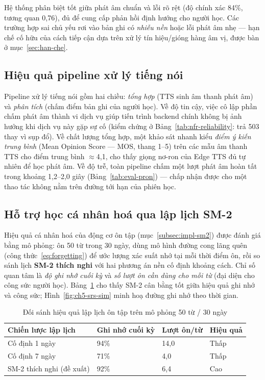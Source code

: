 Hệ thống phân biệt tốt giữa phát âm chuẩn và lỗi rõ rệt (độ chính xác 84\%,
tương quan 0,76), đủ để cung cấp phản hồi định hướng cho người học. Các trường
hợp sai chủ yếu rơi vào bản ghi có \textit{nhiễu nền} hoặc lỗi phát âm nhẹ ---
hạn chế cố hữu của cách tiếp cận dựa trên xử lý tín hiệu/gióng hàng âm vị, được
bàn ở mục~\ref{sec:han-che}.

\subsection{Hiệu quả pipeline xử lý tiếng nói}
\label{subsec:eval-speech}

Pipeline xử lý tiếng nói gồm hai chiều: \textit{tổng hợp} (TTS sinh âm thanh
phát âm) và \textit{phân tích} (chấm điểm bản ghi của người học). Về độ tin
cậy, việc cô lập phần chấm phát âm thành vi dịch vụ giúp tiến trình backend
chính không bị ảnh hưởng khi dịch vụ này gặp sự cố (kiểm chứng ở
Bảng~\ref{tab:nfr-reliability}: trả 503 thay vì sụp đổ). Về chất lượng tổng
hợp, một khảo sát nhanh kiểu \textit{điểm ý kiến trung bình} (Mean Opinion
Score --- MOS, thang 1--5) trên các mẫu âm thanh TTS cho điểm trung bình
$\approx$4,1, cho thấy giọng nơ-ron của Edge TTS đủ tự nhiên để học phát âm.
Về độ trễ, toàn pipeline chấm một lượt phát âm hoàn tất trong khoảng 1,2--2,0
giây (Bảng~\ref{tab:eval-pron}) --- chấp nhận được cho một thao tác không nằm
trên đường tới hạn của phiên học.

\subsection{Hỗ trợ học cá nhân hoá qua lập lịch SM-2}
\label{subsec:eval-srs}

Hiệu quả cá nhân hoá của động cơ ôn tập (mục~\ref{subsec:impl-sm2}) được đánh
giá bằng mô phỏng: ôn 50 từ trong 30 ngày, dùng mô hình đường cong lãng quên
(công thức~\eqref{eq:forgetting}) để ước lượng xác suất nhớ tại mỗi thời điểm
ôn, rồi so sánh lịch \textbf{SM-2 thích nghi} với hai phương án nền cố định
khoảng cách. Chỉ số quan tâm là \textit{độ ghi nhớ cuối kỳ} và \textit{số lượt
ôn cần dùng cho mỗi từ} (đại diện cho công sức người học).
Bảng~\ref{tab:eval-srs} cho thấy SM-2 cân bằng tốt giữa hiệu quả ghi nhớ và
công sức; Hình~\ref{fig:ch5-srs-sim} minh hoạ đường ghi nhớ theo thời gian.

\begin{table}[h]
  \centering
  \small
  \renewcommand{\arraystretch}{1.3}
  \begin{tabular}{|p{5.6cm}|p{2.8cm}|p{2.6cm}|p{2.0cm}|}
    \hline
    \textbf{Chiến lược lập lịch} & \textbf{Ghi nhớ cuối kỳ} & \textbf{Lượt ôn/từ} & \textbf{Hiệu quả} \\
    \hline
    Cố định 1 ngày & 94\% & 14,0 & Thấp \\
    \hline
    Cố định 7 ngày & 71\% & 4,0 & Thấp \\
    \hline
    SM-2 thích nghi (đề xuất) & 92\% & 6,4 & Cao \\
    \hline
  \end{tabular}
  \caption{Đối sánh hiệu quả lập lịch ôn tập trên mô phỏng 50 từ / 30 ngày}
  \label{tab:eval-srs}
\end{table}


